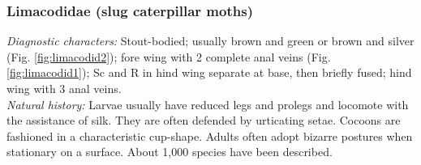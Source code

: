 \documentclass[letterpaper, 11pt]{article}
\begin{document}
\subsubsection{Limacodidae (slug caterpillar moths)}
\noindent{}\textit{Diagnostic characters:} Stout-bodied; usually brown and green or brown and silver (Fig. \ref{fig:limacodid2}); fore wing with 2 complete anal veins (Fig. \ref{fig:limacodid1}); Sc and R in hind wing separate at base, then briefly fused; hind wing with 3 anal veins.\\

\noindent{}\textit{Natural history:} Larvae usually have reduced legs and prolegs and locomote with the assistance of silk. They are often defended by urticating setae. Cocoons are fashioned in a characteristic cup-shape. Adults often adopt bizarre postures when stationary on a surface. About 1,000 species have been described.
\end{document}
